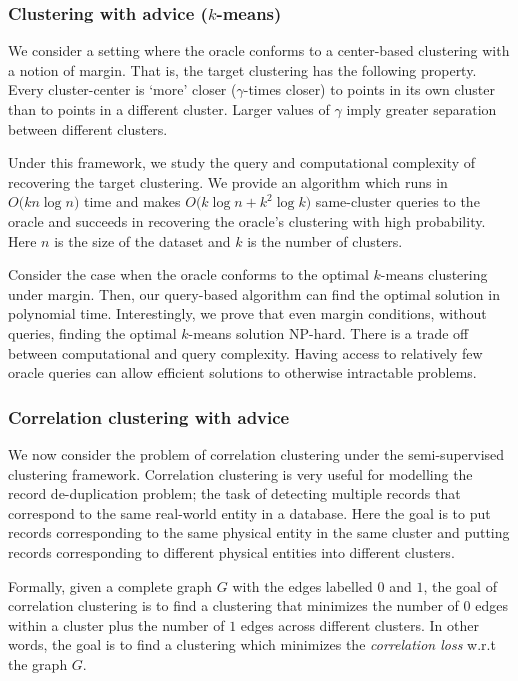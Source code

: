 \documentclass[12pt]{article}
\begin{document}
\subsubsection*{Clustering with advice ($k$-means)}
We consider a setting where the oracle conforms to a center-based clustering with a notion of margin. That is, the target clustering has the following property.  Every cluster-center is `more' closer ($\gamma$-times closer) to points in its own cluster than to points in a different cluster. Larger values of $\gamma$ imply greater separation between different clusters. 

Under this framework, we study the query and computational complexity of recovering the target clustering. We provide an algorithm which runs in $O\big(kn\log n)$ time and makes $O\big(k\log n + k^2 \log k)$ same-cluster queries to the oracle and succeeds in recovering the oracle's clustering with high probability. Here $n$ is the size of the dataset and $k$ is the number of clusters.

Consider the case when the oracle conforms to the optimal $k$-means clustering under margin. Then, our query-based algorithm can find the optimal solution in polynomial time. Interestingly, we prove that even margin conditions, without queries, finding the optimal $k$-means solution NP-hard. There is a trade off between computational and query complexity. Having access to relatively few oracle queries can allow efficient solutions to otherwise intractable problems.

\subsubsection*{Correlation clustering with advice}
We now consider the problem of correlation clustering under the semi-supervised clustering framework. Correlation clustering is very useful for modelling the record de-duplication problem; the task of detecting multiple records that correspond to the same real-world entity in a database. Here the goal is to put records corresponding to the same physical entity in the same cluster and putting records corresponding to different physical entities into different clusters.

Formally, given a complete graph $G$ with the edges labelled $0$ and $1$, the goal of correlation clustering is to find a clustering that minimizes the number of $0$ edges within a cluster plus the number of $1$ edges across different clusters. In other words, the goal is to find a clustering which minimizes the \textit{correlation loss} w.r.t the graph $G$. \\
\end{document}
